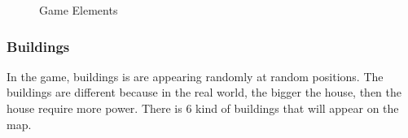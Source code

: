 \begin{figure}[!ht]
\centering
{}
\caption{Game Elements}
\end{figure}



\subsubsection*{Buildings}
In the game, buildings is are appearing randomly at random positions. The buildings are different
because in the real world, the bigger the house, then the house require more power. There is 6 kind
of buildings that will appear on the map. 

